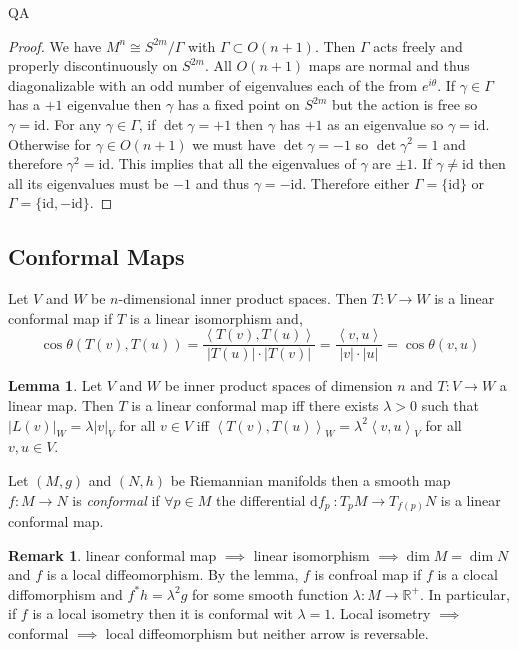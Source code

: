 QA	 \documentclass[12pt]{extarticle}
\newcommand{\R}{\mathbb{R}}
\newcommand{\id}{\mathrm{id}}
\renewcommand{\d}[1]{ \mathrm{d}#1 \:}
\theoremstyle{definition}
\newtheorem{lemma}[theorem]{Lemma}
\newtheorem{remark}{Remark}
\newenvironment{definition}[1][Definition:]{\begin{trivlist}
\item[\hskip \labelsep {\bfseries #1}]}{\end{trivlist}}
\begin{document}
\begin{proof}
We have $M^n \cong S^{2m} / \Gamma$ with $\Gamma \subset O(n+1)$. Then $\Gamma$ acts freely and properly discontinuously on $S^{2m}$. All $O(n+1)$ maps are normal and thus diagonalizable with an odd number of eigenvalues each of the from $e^{i \theta}$. If $\gamma \in \Gamma$ has a $+1$ eigenvalue then $\gamma$ has a fixed point on $S^{2m}$ but the action is free so $\gamma = \id$. For any $\gamma \in \Gamma$, if $\det{\gamma} = +1$ then $\gamma$ has $+1$ as an eigenvalue so $\gamma = \id$. Otherwise for $\gamma \in O(n+1)$ we must have $\det{\gamma} = - 1$ so $\det{\gamma^2} = 1$ and therefore $\gamma^2 = \id$. This implies that all the eigenvalues of $\gamma$ are $\pm 1$. If $\gamma \neq \id$ then all its eigenvalues must be $-1$ and thus $\gamma = - \id$. Therefore either $\Gamma = \{\id\}$ or $\Gamma = \{\id, -\id\}$. 
\end{proof}

\subsection{Conformal Maps}

\newcommand{\inner}[2]{\left< #1 , #2 \right>}

\begin{definition}
Let $V$ and $W$ be $n$-dimensional inner product spaces. Then $T : V \to W$ is a linear conformal map if $T$ is a linear isomorphism and,
\[ \cos{\theta(T(v), T(u))} = \frac{\inner{T(v)}{T(u)}}{|T(u)|\cdot |T(v)|} = \frac{\inner{v}{u}}{|v| \cdot |u|} = \cos{\theta(v, u)} \]
\end{definition}

\begin{lemma}
Let $V$ and $W$ be inner product spaces of dimension $n$ and $T : V \to W$ a linear map. Then $T$ is a linear conformal map iff there exists $\lambda > 0$ such that $|L(v)|_W = \lambda |v|_V$ for all $v \in V$ iff $\inner{T(v)}{T(u)}_W = \lambda^2 \inner{v}{u}_V$ for all $v,u \in V$. 
\end{lemma}

\begin{definition}
Let $(M, g)$ and $(N, h)$ be Riemannian manifolds then a smooth map $f : M \to N$ is \textit{conformal} if $\forall p \in M$ the differential $\d{f_p} : T_p M \to T_{f(p)} N$ is a linear conformal map.
\end{definition}

\begin{remark} 
linear conformal map $\implies$ linear isomorphism $\implies \dim{M} = \dim{N}$ and $f$ is a local diffeomorphism. By the lemma, $f$ is  confroal map if $f$ is a clocal diffomorphism and $f^*h = \lambda^2 g$ for some smooth function $\lambda : M \to \R^+$. In particular, if $f$ is a local isometry then it is conformal wit $\lambda = 1$. Local isometry $\implies$ conformal $\implies$ local diffeomorphism but neither arrow is reversable. 
\end{remark}
\end{document}
